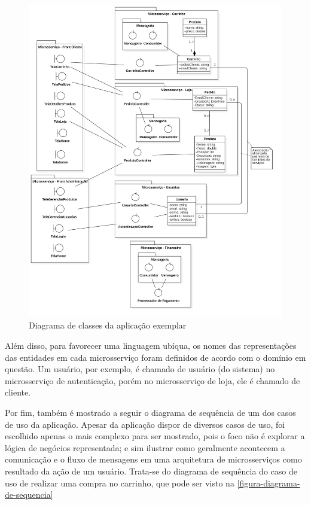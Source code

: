 \begin{figure}[htb]
	\caption{\label{figura-diagrama-de-classes}Diagrama de classes da aplicação exemplar}
	\begin{center}
	    \includegraphics[scale=0.25]{Diagramas/imagens/Classes.jpg}
	\end{center}
\end{figure}

Além disso, para favorecer uma linguagem ubíqua, os nomes das representações das entidades em cada microsserviço foram definidos de acordo com o domínio em questão. Um usuário, por exemplo, é chamado de usuário (do sistema) no microsserviço de autenticação, porém no microsserviço de loja, ele é chamado de cliente.

Por fim, também é mostrado a seguir o diagrama de sequência de um dos casos de uso da aplicação. Apesar da aplicação dispor de diversos casos de uso, foi escolhido apenas o mais complexo para ser mostrado, pois o foco não é explorar a lógica de negócios representada; e sim ilustrar como geralmente acontecem a comunicação e o fluxo de mensagens em uma arquitetura de microsserviços como resultado da ação de um usuário. Trata-se do diagrama de sequência do caso de uso de realizar uma compra no carrinho, que pode ser visto na \autoref{figura-diagrama-de-sequencia}


